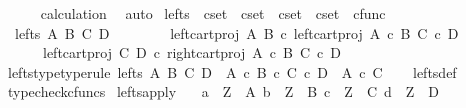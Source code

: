 \begin{isabellebody}
\ \ \ \ \isamarkupfalse%
\ calculation\ \isamarkupfalse%
\ auto\isanewline
{}\isamarkupfalse%
%
\endisatagproof
{\isafoldproof}%
%
\isadelimproof
\isanewline
%
\endisadelimproof
\isanewline
{}\isamarkupfalse%
\ lefts\ {\isacharcolon}{\kern0pt}{\isacharcolon}{\kern0pt}\ {\isachardoublequoteopen}cset\ {\isasymRightarrow}\ cset\ {\isasymRightarrow}\ cset\ {\isasymRightarrow}\ cset\ {\isasymRightarrow}\ cfunc{\isachardoublequoteclose}\ \isanewline
\ \ {\isachardoublequoteopen}lefts\ A\ B\ C\ D\ {\isacharequal}{\kern0pt}\ {\isasymlangle}\isanewline
\ \ \ \ \ \ left{\isacharunderscore}{\kern0pt}cart{\isacharunderscore}{\kern0pt}proj\ A\ B\ {\isasymcirc}\isactrlsub c\ left{\isacharunderscore}{\kern0pt}cart{\isacharunderscore}{\kern0pt}proj\ {\isacharparenleft}{\kern0pt}A\ {\isasymtimes}\isactrlsub c\ B{\isacharparenright}{\kern0pt}\ {\isacharparenleft}{\kern0pt}C\ {\isasymtimes}\isactrlsub c\ D{\isacharparenright}{\kern0pt}{\isacharcomma}{\kern0pt}\isanewline
\ \ \ \ \ \ left{\isacharunderscore}{\kern0pt}cart{\isacharunderscore}{\kern0pt}proj\ C\ D\ {\isasymcirc}\isactrlsub c\ right{\isacharunderscore}{\kern0pt}cart{\isacharunderscore}{\kern0pt}proj\ {\isacharparenleft}{\kern0pt}A\ {\isasymtimes}\isactrlsub c\ B{\isacharparenright}{\kern0pt}\ {\isacharparenleft}{\kern0pt}C\ {\isasymtimes}\isactrlsub c\ D{\isacharparenright}{\kern0pt}\isanewline
\ \ \ \ {\isasymrangle}{\isachardoublequoteclose}\isanewline
\isanewline
{}\isamarkupfalse%
\ lefts{\isacharunderscore}{\kern0pt}type{\isacharbrackleft}{\kern0pt}type{\isacharunderscore}{\kern0pt}rule{\isacharbrackright}{\kern0pt}{\isacharcolon}{\kern0pt}\ {\isachardoublequoteopen}lefts\ A\ B\ C\ D\ {\isacharcolon}{\kern0pt}\ {\isacharparenleft}{\kern0pt}A\ {\isasymtimes}\isactrlsub c\ B{\isacharparenright}{\kern0pt}\ {\isasymtimes}\isactrlsub c\ {\isacharparenleft}{\kern0pt}C\ {\isasymtimes}\isactrlsub c\ D{\isacharparenright}{\kern0pt}\ {\isasymrightarrow}\ {\isacharparenleft}{\kern0pt}A\ {\isasymtimes}\isactrlsub c\ C{\isacharparenright}{\kern0pt}{\isachardoublequoteclose}\isanewline
%
\isadelimproof
\ \ %
\endisadelimproof
%
\isatagproof
{}\isamarkupfalse%
\ lefts{\isacharunderscore}{\kern0pt}def\ \isamarkupfalse%
\ typecheck{\isacharunderscore}{\kern0pt}cfuncs%
\endisatagproof
{\isafoldproof}%
%
\isadelimproof
\isanewline
%
\endisadelimproof
\isanewline
{}\isamarkupfalse%
\ lefts{\isacharunderscore}{\kern0pt}apply{\isacharcolon}{\kern0pt}\isanewline
\ \ \ {\isachardoublequoteopen}a\ {\isacharcolon}{\kern0pt}\ Z\ {\isasymrightarrow}\ A{\isachardoublequoteclose}\ {\isachardoublequoteopen}b\ {\isacharcolon}{\kern0pt}\ Z\ {\isasymrightarrow}\ B{\isachardoublequoteclose}\ {\isachardoublequoteopen}c\ {\isacharcolon}{\kern0pt}\ Z\ {\isasymrightarrow}\ C{\isachardoublequoteclose}\ {\isachardoublequoteopen}d\ {\isacharcolon}{\kern0pt}\ Z\ {\isasymrightarrow}\ D{\isachardoublequoteclose}\isanewline

\end{isabellebody}
